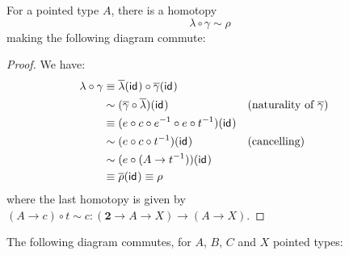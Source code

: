 \documentclass{article}
\renewcommand{\smash}{\wedge}
\renewcommand{\o}{\ensuremath{\circ}}
\newcommand{\sy}{^{-1}}
\newcommand{\rhobar}{\overline{\rho}}
\newcommand{\lambdabar}{\overline{\lambda}}
\newcommand{\gammabar}{\overline{\gamma}}
\newcommand{\two}{\mathbf{2}}
\begin{document}
\begin{thm}\label{thm:smash-braiding-unitors}
	For a pointed type $A$, there is a homotopy
	\[\lambda \o \gamma \sim \rho\]
	making the following diagram commute:
	\begin{center}
	\end{center}
\end{thm}
\begin{proof}
	We have:
	\begin{align*}
		\lambda \o \gamma
		&\judgeq \lambdabar(\idfunc) \o \gammabar(\idfunc)\\
		&\sim (\gammabar \o \lambdabar)(\idfunc) &&\text{(naturality of $\gammabar$)}\\
		&\judgeq (e \o c \o e\sy \o e \o t\sy)(\idfunc)\\
		&\sim (e \o c \o t\sy)(\idfunc) &&\text{(cancelling)}\\
		&\sim (e \o (A \to t\sy))(\idfunc)\\
		&\judgeq \rhobar(\idfunc) \judgeq \rho
	\end{align*}		
	where the last homotopy is given by $(A \to c) \o t \sim c : (\two \to A \to X) \to (A \to X)$.
\end{proof}

\begin{lem}\label{lem:pentagon-c}
	The following diagram commutes, for $A$, $B$, $C$ and $X$ pointed types:
	\begin{center}
	\end{center}
\end{lem}
\end{document}
